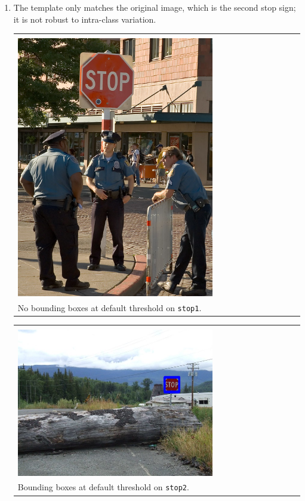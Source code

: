 \documentclass{article}
\begin{document}
\begin{enumerate}[label=(\roman*)]
\pagebreak

\item %
The template only matches the original image, which is the second stop sign; it is not robust to intra-class variation.

\begin{tabular}[t]{l}
	\hline \\
	\includegraphics[width=0.7\textwidth]{img/stop1_detection.png} \\
	No bounding boxes at default threshold on \texttt{stop1}. \\
	\hline
\end{tabular}

\begin{tabular}[t]{l}
	\hline \\
	\includegraphics[width=0.7\textwidth]{img/stop2_detection.png} \\
	Bounding boxes at default threshold on \texttt{stop2}. \\
	\hline
\end{tabular}


\end{enumerate}
\end{document}
